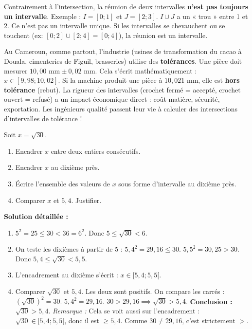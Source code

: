 \documentclass[11pt]{article}
\begin{document}
\begin{attention}
Contrairement à l'intersection, la réunion de deux intervalles \textbf{n'est pas toujours un intervalle}.
Exemple : $I = [0;1]$ et $J = [2;3]$. $I \cup J$ a un « trou » entre 1 et 2. Ce n'est pas un intervalle unique.
Si les intervalles se chevauchent ou se touchent (ex: $[0;2] \cup [2;4] = [0;4]$), la réunion est un intervalle.
\end{attention}

\begin{savaistu}
Au Cameroun, comme partout, l'industrie (usines de transformation du cacao à Douala, cimenteries de Figuil, brasseries) utilise des \textbf{tolérances}. Une pièce doit mesurer $10,00 \text{ mm} \pm 0,02 \text{ mm}$.
Cela s'écrit mathématiquement : $x \in [9,98 ; 10,02]$.
Si la machine produit une pièce à $10,021 \text{ mm}$, elle est \textbf{hors tolérance} (rebut). La rigueur des intervalles (crochet fermé = accepté, crochet ouvert = refusé) a un impact économique direct : coût matière, sécurité, exportation. Les ingénieurs qualité passent leur vie à calculer des intersections d'intervalles de tolérance !
\end{savaistu}

\begin{exoresolu}
Soit $x = \sqrt{30}$.
\begin{enumerate}
    \item Encadrer $x$ entre deux entiers consécutifs.
    \item Encadrer $x$ au dixième près.
    \item Écrire l'ensemble des valeurs de $x$ sous forme d'intervalle au dixième près.
    \item Comparer $x$ et $5,4$. Justifier.
\end{enumerate}

\textbf{Solution détaillée :}
\begin{enumerate}
    \item $5^2 = 25 \le 30 < 36 = 6^2$. Donc $\boxed{5 \le \sqrt{30} < 6}$.
    \item On teste les dixièmes à partir de 5 :
        $5,4^2 = 29,16 \le 30$.
        $5,5^2 = 30,25 > 30$.
        Donc $\boxed{5,4 \le \sqrt{30} < 5,5}$.
    \item L'encadrement au dixième s'écrit : $x \in \boxed{[5,4 ; 5,5[}$.
    \item Comparer $\sqrt{30}$ et $5,4$.
        Les deux sont positifs. On compare les carrés :
        $(\sqrt{30})^2 = 30$.
        $5,4^2 = 29,16$.
        $30 > 29,16 \implies \sqrt{30} > 5,4$.
        \textbf{Conclusion :} $\boxed{\sqrt{30} > 5,4}$.
        \emph{Remarque :} Cela se voit aussi sur l'encadrement : $\sqrt{30} \in [5,4 ; 5,5[$, donc il est $\ge 5,4$. Comme $30 \neq 29,16$, c'est strictement $>$.
\end{enumerate}
\end{exoresolu}
\end{document}

